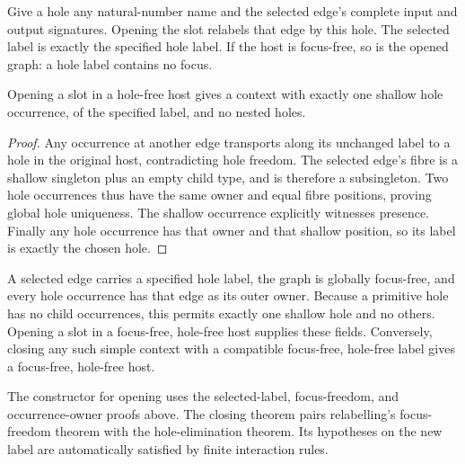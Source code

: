 \begin{definition}\label{term:opened-search-slot}
Give a hole any natural-number name and the selected edge's complete input
and output signatures. Opening the slot relabels that edge by this hole.
The selected label is exactly the specified hole label. If the host is
focus-free, so is the opened graph: a hole label contains no focus.
\end{definition}
\begin{lemma}
Opening a slot in a hole-free host gives a context with exactly one shallow
hole occurrence, of the specified label, and no nested holes.
\end{lemma}
\begin{proof}
Any occurrence at another edge transports along its unchanged label to a hole
in the original host, contradicting hole freedom. The selected edge's fibre
is a shallow singleton plus an empty child type, and is therefore a
subsingleton. Two hole occurrences thus have the same owner and equal fibre
positions, proving global hole uniqueness. The shallow occurrence explicitly
witnesses presence. Finally any hole occurrence has that owner and that
shallow position, so its label is exactly the chosen hole.
\end{proof}
\begin{definition}\label{term:simple-search-context}
A selected edge carries a specified hole label, the graph is globally
focus-free, and every hole occurrence has that edge as its outer owner.
Because a primitive hole has no child occurrences, this permits exactly one
shallow hole and no others. Opening a slot in a focus-free, hole-free host
supplies these fields. Conversely, closing any such simple context with a
compatible focus-free, hole-free label gives a focus-free, hole-free host.
\end{definition}
The constructor for opening uses the selected-label, focus-freedom, and
occurrence-owner proofs above. The closing theorem pairs relabelling's
focus-freedom theorem with the hole-elimination theorem. Its hypotheses on
the new label are automatically satisfied by finite interaction rules.


